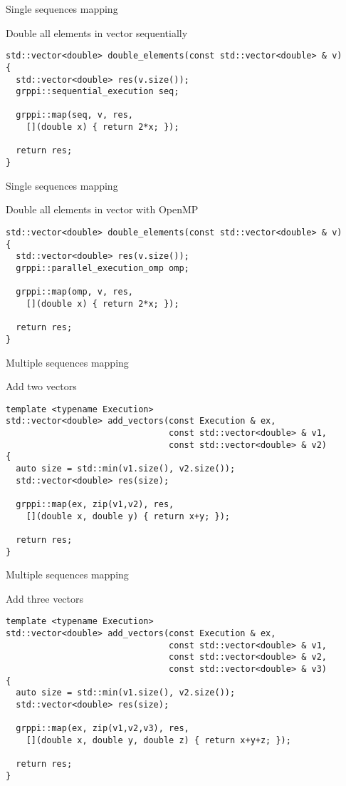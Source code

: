 \begin{frame}[t,fragile]{Single sequences mapping}
\begin{block}{Double all elements in vector sequentially}
\begin{lstlisting}
std::vector<double> double_elements(const std::vector<double> & v) 
{
  std::vector<double> res(v.size());
  grppi::sequential_execution seq;

  grppi::map(seq, v, res, 
    [](double x) { return 2*x; });

  return res;
}
\end{lstlisting}
\end{block}
\end{frame}

\begin{frame}[t,fragile]{Single sequences mapping}
\begin{block}{Double all elements in vector with OpenMP}
\begin{lstlisting}
std::vector<double> double_elements(const std::vector<double> & v) 
{
  std::vector<double> res(v.size());
  grppi::parallel_execution_omp omp;

  grppi::map(omp, v, res, 
    [](double x) { return 2*x; });

  return res;
}
\end{lstlisting}
\end{block}
\end{frame}

\begin{frame}[t,fragile]{Multiple sequences mapping}
\begin{block}{Add two vectors}
\begin{lstlisting}
template <typename Execution>
std::vector<double> add_vectors(const Execution & ex, 
                                const std::vector<double> & v1,
                                const std::vector<double> & v2) 
{
  auto size = std::min(v1.size(), v2.size());
  std::vector<double> res(size);

  grppi::map(ex, zip(v1,v2), res,
    [](double x, double y) { return x+y; });

  return res;
}
\end{lstlisting}
\end{block}
\end{frame}

\begin{frame}[t,fragile]{Multiple sequences mapping}
\begin{block}{Add three vectors}
\begin{lstlisting}
template <typename Execution>
std::vector<double> add_vectors(const Execution & ex, 
                                const std::vector<double> & v1,
                                const std::vector<double> & v2,
                                const std::vector<double> & v3) 
{
  auto size = std::min(v1.size(), v2.size());
  std::vector<double> res(size);

  grppi::map(ex, zip(v1,v2,v3), res,
    [](double x, double y, double z) { return x+y+z; });

  return res;
}
\end{lstlisting}
\end{block}
\end{frame}
